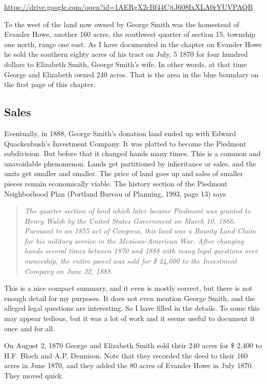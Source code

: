 \documentclass[
  12pt,
]{book}
\begin{document}
\url{https://drive.google.com/open?id=1AERgX2cBf44CjtJ608IxXLA0rYUVPAQB}

To the west of the land now owned by George Smith was the homestead of Evander Howe, another 160 acres, the southwest quarter of section 15, township one north, range one east. As I have documented in the chapter on Evander Howe he sold the southern eighty acres of his tract on July, 5 1870 for four hundred dollars to Elizabeth Smith, George Smith's wife. In other words, at that time George and Elizabeth owned 240 acres. That is the area in the blue boundary on the first page of this chapter.

\hypertarget{sales-1}{%
\subsection{Sales}\label{sales-1}}

Eventually, in 1888, George Smith's donation land ended up with Edward Quackenbush's Investment Company. It was platted to become the Piedmont subdivision. But before that it changed hands many times. This is a common and unavoidable phenomenon. Lands get partitioned by inheritance or sales, and the units get smaller and smaller. The price of land goes up and sales of smaller pieces remain economically viable. The history section of the Piedmont Neighborhood Plan (Portland Bureau of Planning, 1993, page 13) says

\begin{quote}
\emph{The quarter section of land which later became Piedmont was granted to Henry Walsh by the United States Government on March 10, 1866. Pursuant to an 1855 act of Congress, this land was a Bounty Land Claim for his military service in the Mexican-American War. After changing hands several times between 1870 and 1888 with many legal questions over ownership, the entire parcel was sold for \$ 24,000 to the Investment Company on June 22, 1888.}
\end{quote}

This is a nice compact summary, and it even is mostly correct, but there is not enough detail for my purposes. It does not even mention George Smith, and the alleged legal questions are interesting. So I have filled in the details. To some this may appear tedious, but it was a lot of work and it seems useful to document it once and for all.

On August 2, 1870 George and Elizabeth Smith sold their 240 acres for \$ 2,400 to H.F. Bloch and A.P. Dennison. Note that they recorded the deed to their 160 acres in June 1870, and they added the 80 acres of Evander Howe in July 1870. They moved quick.
\end{document}

